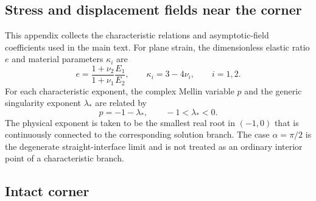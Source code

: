 \documentclass[pdflatex,iicol,sn-mathphys-ay]{sn-jnl}
\begin{document}
\begin{appendices}
\section{Stress and displacement fields near the corner}
\label{app:asymptotics}
\providecommand{\SingularityExponentFigure}{Figure~\ref{fig:singularity-exponents}}

\setcounter{equation}{0}
\renewcommand{\theequation}{A.\arabic{equation}}

This appendix collects the characteristic relations and asymptotic-field
coefficients used in the main text. For plane strain, the dimensionless
elastic ratio $e$ and material parameters $\kappa_i$ are
\begin{equation*}
  e=\frac{1+\nu_2}{1+\nu_1}\frac{E_1}{E_2},
  \qquad
  \kappa_i=3-4\nu_i,\qquad i=1,2.
\end{equation*}
For each characteristic exponent, the complex Mellin variable $p$ and
the generic singularity exponent $\lambda_*$ are related by
\begin{equation*}
  p=-1-\lambda_*,
  \qquad -1<\lambda_*<0.
\end{equation*}
The physical exponent is taken to be the smallest real root in
$(-1,0)$ that is continuously connected to the corresponding solution
branch. The case $\alpha=\pi/2$ is the degenerate straight-interface
limit and is not treated as an ordinary interior point of a
characteristic branch.

\subsection{Intact corner}


\end{appendices}
\end{document}
